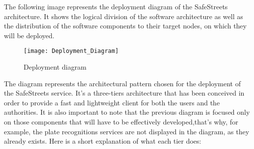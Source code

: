 The following image represents the deployment diagram of the SafeStreets architecture. It shows the logical division of the software architecture as well as the distribution of the software components to their target nodes, on which they will be deployed.

\begin{figure}[H]
  \centering
  \texttt{[image: Deployment\_Diagram]}
  \caption{Deployment diagram}
  \label{fig:deployment_diag}
\end{figure}

The diagram represents the architectural pattern chosen for the deployment of the SafeStreets service. It's a three-tiers architecture that has been conceived in order to provide a fast and lightweight client for both the users and the authorities. 
It is also important to note that the previous diagram is focused only on those components that will have to be effectively developed,that's why, for example, the plate recognitions services are not displayed in the diagram, as they already exists.
Here is a short explanation of what each tier does:
